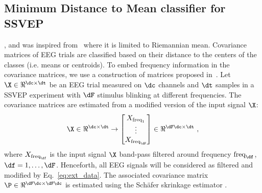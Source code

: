 \subsection{Minimum Distance to Mean classifier for SSVEP}
\label{subsec:mdm}
, and was inspired from~\cite{barachant_multiclass_2012} where it is limited to Riemannian mean.
Covariance matrices of EEG trials are classified based on their distance to the centers of the classes (i.e. means or centroids).
To embed frequency information in the covariance matrices, we use a construction of matrices proposed in~\cite{congedo_new_2013}.
Let $\X \in \Re^{\dc\times\dt}$ be an EEG trial measured on $\dc$ channels and $\dt$ samples in a SSVEP experiment with $\dF$ stimulus blinking at different frequencies.  
The covariance matrices are estimated from a modified version of the input signal $\X$: %
\begin{equation}
	\X \in \Re^{\dc \times \dt} \rightarrow 	
	\begin{bmatrix}
		X_{\text{freq}_1}\\ \vdots \\ X_{\text{freq}_{\dF}} \\
	\end{bmatrix}
	\in \Re^{\dF\dc \times \dt} \ ,
	\label{eq:ext_data}
\end{equation}
where $X_{\text{freq}_\df}$ is the input signal $\X$ band-pass filtered around frequency $\text{freq}_\df$, $\df=1, \ldots, \dF$. Henceforth, all EEG signals will be considered as filtered and modified by Eq.~\eqref{eq:ext_data}.
The associated covariance matrix $\P \in \Re^{\dF\dc \times \dF\dc}$ is estimated using the Sch\"{a}fer skrinkage estimator \cite{schafer_shrinkage_2005}.


